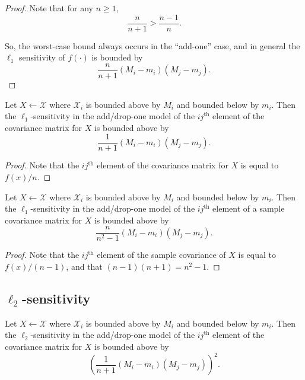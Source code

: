 \documentclass[11pt]{scrartcl} %
\begin{document}
\begin{proof}
Note that for any $n \ge 1$,
	\begin{equation}
	\label{ineq}
	 \frac{n}{n + 1} > \frac{n-1}{n}.
	\end{equation}

So, the worst-case bound always occurs in the ``add-one'' case, and in general the  $\ell_1$ sensitivity of $f(\cdot)$ is bounded by
 $$ \frac{n}{n+1}  (M_i - m_i)(M_j - m_j).$$ 
\end{proof}

\begin{corollary}
\label{cor:renorm}
Let $X \leftarrow \mathcal{X}$ where $\mathcal{X}_i$ is bounded above by $M_i$ and bounded below by $m_i$. Then the $\ell_1$-sensitivity in the add/drop-one model of the $ij^{\text{th}}$ element of the covariance matrix for $X$ is bounded above by 
$$ \frac{1}{n+1}(M_i - m_i)(M_j - m_j).$$
\end{corollary}

\begin{proof}
Note that the $ij^{\text{th}}$ element of the covariance matrix for $X$ is equal to $f(x)/n$.
\end{proof}

\begin{corollary}
\label{cor:renorm}
Let $X \leftarrow \mathcal{X}$ where $\mathcal{X}_i$ is bounded above by $M_i$ and bounded below by $m_i$. Then the $\ell_1$-sensitivity in the add/drop-one model of the $ij^{\text{th}}$ element of a sample covariance matrix for $X$ is bounded above by 
$$ \frac{n}{n^2-1}(M_i - m_i)(M_j - m_j).$$
\end{corollary}

\begin{proof}
Note that the $ij^{\text{th}}$ element of the sample covariance of $X$ is equal to $f(x)/(n-1)$, and that $(n-1)(n+1) = n^2 -1$.
\end{proof}

\subsection{$\ell_2$-sensitivity}

\begin{theorem}
Let $X \leftarrow \mathcal{X}$ where $\mathcal{X}_i$ is bounded above by $M_i$ and bounded below by $m_i$. Then the $\ell_2$-sensitivity in the add/drop-one model of the $ij^{\text{th}}$ element of the covariance matrix for $X$ is bounded above by
$$\left(\frac{1}{n+1}(M_i - m_i)(M_j - m_j)\right)^2.$$
\end{theorem}
\end{document}
